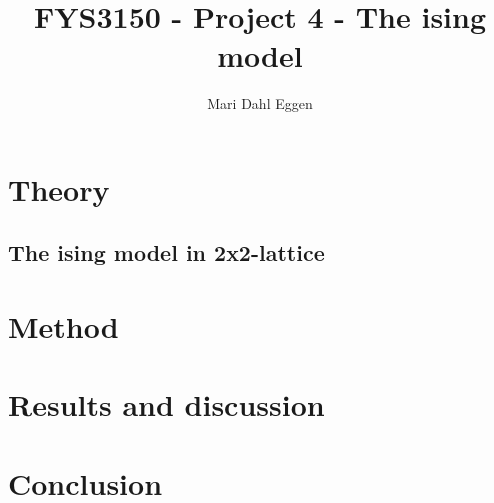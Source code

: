 \documentclass[12pt]{article}
\begin{document}
\title{FYS3150 - Project 4 - The ising model}
\author{Mari Dahl Eggen}
\maketitle

\newpage

\begin{flushleft}
\section{Theory}
\subsection*{The ising model in 2x2-lattice}



\section{Method}


\section{Results and discussion}


\section{Conclusion}


\end{flushleft}
\end{document}
